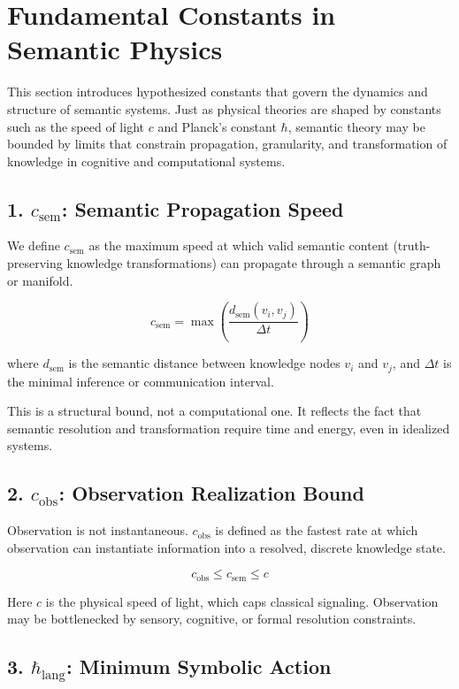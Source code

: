 


\section*{Fundamental Constants in Semantic Physics}

This section introduces hypothesized constants that govern the dynamics and structure of semantic systems. Just as physical theories are shaped by constants such as the speed of light $c$ and Planck's constant $\hbar$, semantic theory may be bounded by limits that constrain propagation, granularity, and transformation of knowledge in cognitive and computational systems.

\subsection*{1. $c_{\text{sem}}$: Semantic Propagation Speed}

We define $c_{\text{sem}}$ as the maximum speed at which valid semantic content (truth-preserving knowledge transformations) can propagate through a semantic graph or manifold.

\[
c_{\text{sem}} = \max \left( \frac{d_\text{sem}(v_i, v_j)}{\Delta t} \right)
\]

where $d_\text{sem}$ is the semantic distance between knowledge nodes $v_i$ and $v_j$, and $\Delta t$ is the minimal inference or communication interval.

This is a structural bound, not a computational one. It reflects the fact that semantic resolution and transformation require time and energy, even in idealized systems.

\subsection*{2. $c_{\text{obs}}$: Observation Realization Bound}

Observation is not instantaneous. $c_{\text{obs}}$ is defined as the fastest rate at which observation can instantiate information into a resolved, discrete knowledge state.

\[
c_{\text{obs}} \leq c_{\text{sem}} \leq c
\]

Here $c$ is the physical speed of light, which caps classical signaling. Observation may be bottlenecked by sensory, cognitive, or formal resolution constraints.

\subsection*{3. $\hbar_{\text{lang}}$: Minimum Symbolic Action}

